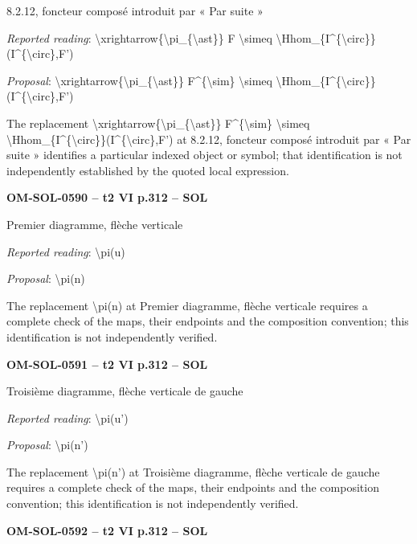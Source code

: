 8.2.12, foncteur composé introduit par « Par suite »\par
\emph{Reported reading}: \textbackslash{}xrightarrow\{\textbackslash{}pi\_\{\textbackslash{}ast\}\} F \textbackslash{}simeq \textbackslash{}Hhom\_\{I\textasciicircum{}\{\textbackslash{}circ\}\}(I\textasciicircum{}\{\textbackslash{}circ\},F')\par
\emph{Proposal}: \textbackslash{}xrightarrow\{\textbackslash{}pi\_\{\textbackslash{}ast\}\} F\textasciicircum{}\{\textbackslash{}sim\} \textbackslash{}simeq \textbackslash{}Hhom\_\{I\textasciicircum{}\{\textbackslash{}circ\}\}(I\textasciicircum{}\{\textbackslash{}circ\},F')\par
The replacement \textbackslash{}xrightarrow\{\textbackslash{}pi\_\{\textbackslash{}ast\}\} F\textasciicircum{}\{\textbackslash{}sim\} \textbackslash{}simeq \textbackslash{}Hhom\_\{I\textasciicircum{}\{\textbackslash{}circ\}\}(I\textasciicircum{}\{\textbackslash{}circ\},F') at 8.2.12, foncteur composé introduit par « Par suite » identifies a particular indexed object or symbol; that identification is not independently established by the quoted local expression.\par
\par\noindent\textbf{OM-SOL-0590 -- t2 VI p.312 -- SOL}\par
Premier diagramme, flèche verticale\par
\emph{Reported reading}: \textbackslash{}pi(u)\par
\emph{Proposal}: \textbackslash{}pi(n)\par
The replacement \textbackslash{}pi(n) at Premier diagramme, flèche verticale requires a complete check of the maps, their endpoints and the composition convention; this identification is not independently verified.\par
\par\noindent\textbf{OM-SOL-0591 -- t2 VI p.312 -- SOL}\par
Troisième diagramme, flèche verticale de gauche\par
\emph{Reported reading}: \textbackslash{}pi(u')\par
\emph{Proposal}: \textbackslash{}pi(n')\par
The replacement \textbackslash{}pi(n') at Troisième diagramme, flèche verticale de gauche requires a complete check of the maps, their endpoints and the composition convention; this identification is not independently verified.\par
\par\noindent\textbf{OM-SOL-0592 -- t2 VI p.312 -- SOL}\par
